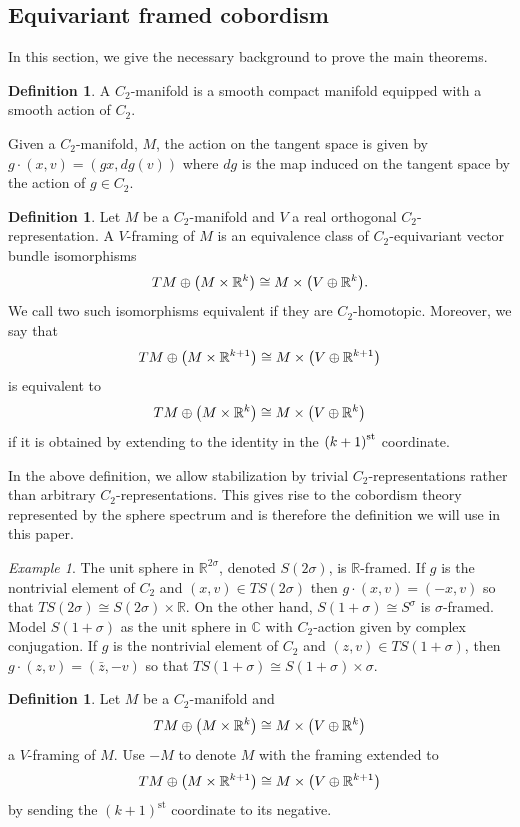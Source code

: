 \documentclass[11pt]{amsart}
\newcommand{\R}{\mathbb R}
\newcommand{\C}{\mathbb C}
\theoremstyle{plain}   %
\theoremstyle{definition}
\newtheorem{df}[thm]{Definition}
\theoremstyle{remark}
\newtheorem{ex}[thm]{Example}
\numberwithin{equation}{section}
\let\originalleft\left
\let\originalright\right
\renewcommand{\left}{\mathopen{}\mathclose\bgroup\originalleft}
\renewcommand{\right}{\aftergroup\egroup\originalright}
\begin{document}
\subsection{Equivariant framed cobordism}

In this section, we give the necessary background to prove the main theorems.

\begin{df}
A $C_2$-manifold is a smooth compact manifold equipped with a smooth action of $C_2$. 
\end{df}

Given a $C_2$-manifold, $M$, the action on the tangent space is given by $g\cdot(x,v) = (gx,dg(v))$ where $dg$ is the map induced on the tangent space by the action of $g\in C_2$. 

\begin{df}\label{df:framing}
Let $M$ be a $C_2$-manifold and $V$ a real orthogonal $C_2$-representation. A $V$-framing of $M$ is an equivalence class of $C_2$-equivariant vector bundle isomorphisms
\[
TM\oplus \left(M\times \R^k\right)\cong M\times \left(V\oplus\R^k\right).
\]
We call two such isomorphisms equivalent if they are $C_2$-homotopic. Moreover, we say that 
\[
TM\oplus \left(M\times \R^{k+1}\right)\cong M\times \left(V\oplus\R^{k+1}\right)
\]
is equivalent to 
\[
TM\oplus \left(M\times \R^k\right)\cong M\times \left(V\oplus\R^k\right)
\]
if it is obtained by extending to the identity in the $\left(k+1\right)^{\text{st}}$ coordinate. 
\end{df}

In the above definition, we allow stabilization by trivial $C_2$-representations rather than arbitrary $C_2$-representations. This gives rise to the cobordism theory represented by the sphere spectrum and is therefore the definition we will use in this paper.

\begin{ex}\label{ex:framing}
The unit sphere in $\R^{2\sigma}$, denoted $S(2\sigma)$, is $\R$-framed. If $g$ is the nontrivial element of $C_2$ and $(x,v)\in TS(2\sigma)$ then $g\cdot(x,v)=(-x,v)$ so that $TS(2\sigma)\cong S(2\sigma)\times \R$. On the other hand, $S(1+\sigma)\cong S^\sigma$ is $\sigma$-framed. Model $S(1+\sigma)$ as the unit sphere in $\C$ with $C_2$-action given by complex conjugation. If $g$ is the nontrivial element of $C_2$ and $(z,v)\in TS(1+\sigma)$, then $g\cdot (z,v) = (\bar{z},-v)$ so that $TS(1+\sigma)\cong S(1+\sigma)\times \sigma$.
\end{ex}

\begin{df}
Let $M$ be a $C_2$-manifold and
\[
TM\oplus \left(M\times \R^k\right)\cong M\times \left(V\oplus\R^k\right)
\]
a $V$-framing of $M$. Use $-M$ to denote $M$ with the framing extended to
\[
TM\oplus \left(M\times\R^{k+1}\right)\cong M\times \left(V\oplus\R^{k+1}\right)
\]
by sending the $(k+1)^{\text{st}}$ coordinate to its negative.
\end{df}
\end{document}
